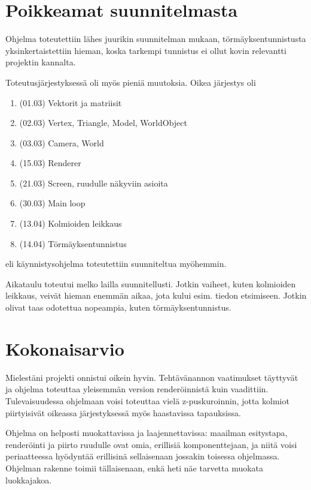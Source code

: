 \documentclass[12pt] {article}
\begin{document}
\section {Poikkeamat suunnitelmasta}

Ohjelma toteutettiin lähes juurikin suunnitelman mukaan, törmäyksentunnistusta yksinkertaistettiin hieman, koska tarkempi tunnistus ei ollut kovin relevantti projektin kannalta.

Toteutusjärjestyksessä oli myös pieniä muutoksia. Oikea järjestys oli

\begin{enumerate}
	\item (01.03) Vektorit ja matriisit
	\item (02.03) Vertex, Triangle, Model, WorldObject
	\item (03.03) Camera, World
	\item (15.03) Renderer
	\item (21.03) Screen, ruudulle näkyviin asioita
	\item (30.03) Main loop
	\item (13.04) Kolmioiden leikkaus
	\item (14.04) Törmäyksentunnistus
\end{enumerate}

eli käynnistysohjelma toteutettiin suunniteltua myöhemmin.

Aikataulu toteutui melko lailla suunnitellusti. Jotkin vaiheet, kuten kolmioiden leikkaus, veivät hieman enemmän aikaa, jota kului esim. tiedon etsimiseen. Jotkin olivat taas odotettua nopeampia, kuten törmäyksentunnistus.

\section {Kokonaisarvio}

Mielestäni projekti onnistui oikein hyvin. Tehtävänannon vaatimukset täyttyvät ja ohjelma toteuttaa yleisemmän version renderöinnistä kuin vaadittiin. Tulevaisuudessa ohjelmaan voisi toteuttaa vielä z-puskuroinnin, jotta kolmiot piirtyisivät oikeassa järjestyksessä myös haastavissa tapauksissa.

Ohjelma on helposti muokattavissa ja laajennettavissa: maailman esitystapa, renderöinti ja piirto ruudulle ovat omia, erillisiä komponenttejaan, ja niitä voisi periaatteessa hyödyntää erillisinä sellaisenaan jossakin toisessa ohjelmassa. Ohjelman rakenne toimii tällaisenaan, enkä heti näe tarvetta muokata luokkajakoa.
\end{document}

